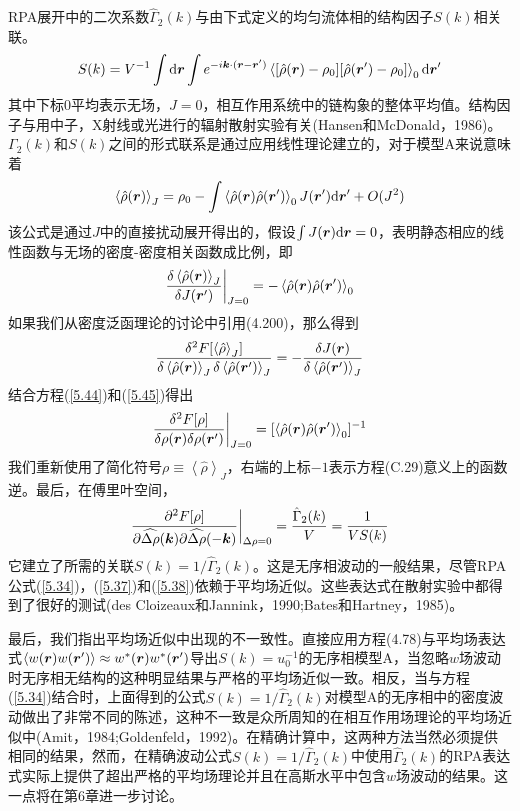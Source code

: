 RPA展开中的二次系数$\hat{\Gamma}_2(k)$与由下式定义的均匀流体相的结构因子$S(k)$相关联。
\begin{equation}
S(k)=V^{-1}\int\mathrm{d}\bm{r}\int e^{-i\bm{k}\cdot(\bm{r}-\bm{r}')}\left\langle[\hat{\rho}(\bm{r})-\rho_0][\hat{\rho}(\bm{r}')-\rho_0]\right\rangle_0\mathrm{d}\bm{r}'
\end{equation}
其中下标$0$平均表示无场，$J=0$，相互作用系统中的链构象的整体平均值。结构因子与用中子，X射线或光进行的辐射散射实验有关(Hansen和McDonald，1986)。$\Gamma_2(k)$和$S(k)$之间的形式联系是通过应用线性理论建立的，对于模型A来说意味着
\begin{equation}
\left\langle\hat{\rho}(\bm{r})\right\rangle_J=\rho_0-\int\left\langle\hat{\rho}(\bm{r})\hat{\rho}(\bm{r}')\right\rangle_0J(\bm{r}')\mathrm{d}\bm{r}'+O(J^2)
\end{equation}
该公式是通过$J$中的直接扰动展开得出的，假设$\int J(\bm{r})\mathrm{d}\bm{r}=0$，表明静态相应的线性函数与无场的密度-密度相关函数成比例，即
\begin{equation}\label{5.44}
\frac{\delta\left\langle\hat{\rho}(\bm{r})\right\rangle_J}{\delta J(\bm{r}')}\bigg|_{J=0}=-\left\langle\hat{\rho}(\bm{r})\hat{\rho}(\bm{r}')\right\rangle_0
\end{equation}
如果我们从密度泛函理论的讨论中引用(4.200)，那么得到
\begin{equation}\label{5.45}
\frac{\delta^2F[\left\langle\hat{\rho}\right\rangle_J]}{\delta\left\langle\hat{\rho}(\bm{r})\right\rangle_J\delta\left\langle\hat{\rho}(\bm{r}')\right\rangle_J}=-\frac{\delta J(\bm{r})}{\delta\left\langle\hat{\rho}(\bm{r}')\right\rangle_J}
\end{equation}
结合方程(\ref{5.44})和(\ref{5.45})得出
\begin{equation}
\frac{\delta^2F[\rho]}{\delta\rho(\bm{r})\delta\rho(\bm{r}')}\bigg|_{J=0}=[\left\langle\hat{\rho}(\bm{r})\hat{\rho}(\bm{r}')\right\rangle_0]^{-1}
\end{equation}
我们重新使用了简化符号$\rho\equiv\left\langle\hat{\rho}\right\rangle_J$，右端的上标$-1$表示方程(C.29)意义上的函数逆。最后，在傅里叶空间，
\begin{equation}
\frac{\partial^2F[\rho]}{\partial\widehat{\Delta\rho}(\bm{k})\partial\widehat{\Delta\rho}(-\bm{k})}\bigg|_{\Delta\rho=0}=\frac{\hat{\Gamma}_2(k)}{V}=\frac{1}{VS(k)}
\end{equation}
它建立了所需的关联$S(k)=1/\hat{\Gamma}_2(k)$。这是无序相波动的一般结果，尽管RPA公式(\ref{5.34})，(\ref{5.37})和(\ref{5.38})依赖于平均场近似。这些表达式在散射实验中都得到了很好的测试(des Cloizeaux和Jannink，1990;Bates和Hartney，1985)。

最后，我们指出平均场近似中出现的不一致性。直接应用方程(4.78)与平均场表达式$\left\langle w(\bm{r})w(\bm{r}')\right\rangle\approx w^*(\bm{r})w^*(\bm{r}')$导出$S(k)=u_0^{-1}$的无序相模型A，当忽略$w$场波动时无序相无结构的这种明显结果与严格的平均场近似一致。相反，当与方程(\ref{5.34})结合时，上面得到的公式$S(k)=1/\hat{\Gamma}_2(k)$对模型A的无序相中的密度波动做出了非常不同的陈述，这种不一致是众所周知的在相互作用场理论的平均场近似中(Amit，1984;Goldenfeld，1992)。在精确计算中，这两种方法当然必须提供相同的结果，然而，在精确波动公式$S(k)=1/\hat{\Gamma}_2(k)$中使用$\hat{\Gamma}_2(k)$的RPA表达式实际上提供了超出严格的平均场理论并且在高斯水平中包含$w$场波动的结果。这一点将在第6章进一步讨论。
